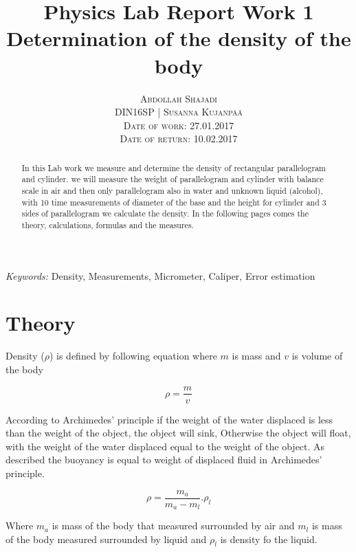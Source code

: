 \documentclass[a4paper, 12pt]{article}
\title{\textbf{Physics Lab Report Work 1}\\
	Determination of the density of the body}
\author{\textsc{Abdollah Shajadi}
	\\{\textsc{DIN16SP | Susanna Kujanp{\"a}{\"a}}}
	\\{\textsc{Date of work: 27.01.2017}}
	\\{\textsc{Date of return: 10.02.2017}}}
\makeatletter
\renewcommand{\maketitle}{ 
	\begin{flushright} 
		{\LARGE\@title} 
		
		\vspace{50pt} 
		
		{\large\@author} 
		
		\vspace{40pt} 
	\end{flushright}
}
\makeatother
\begin{document}
	
	\maketitle 
	
\clearpage

\tableofcontents

\clearpage

\renewcommand{\abstractname}{Summary} 

\begin{abstract}

In this Lab work we measure and determine the density of rectangular parallelogram and cylinder.
we will measure the weight of parallelogram and cylinder with balance scale in air and then only parallelogram also in water and unknown liquid (alcohol), with 10 time measurements of diameter of the base and the height for cylinder and 3 sides of parallelogram we calculate the density. 
In the following pages comes the theory, calculations, formulas and the measures.

\end{abstract}

\hspace*{3,6mm}\textit{Keywords:} Density, Measurements, Micrometer, Caliper, Error estimation 

\vspace{30pt}


\section{Theory}

Density (\(\rho\)) is defined by following equation where \(m\) is mass and \(v\) is volume of the body

\[\rho = \dfrac{m}{v}\]

According to Archimedes' principle if the weight of the water displaced is less than the weight of the object, the object will sink, Otherwise the object will float, with the weight of the water displaced equal to the weight of the object. 
As described the buoyancy is equal to weight of displaced fluid in Archimedes' principle.

\[
\rho = \frac{m_{a}}{m_{a}-m_{l}}.\rho_{l}
\]

Where \(m_{a}\) is mass of the body that measured surrounded by air and \(m_{l}\) is mass of the body measured surrounded by liquid and \(\rho_{l}\) is density fo the liquid.
\end{document}

